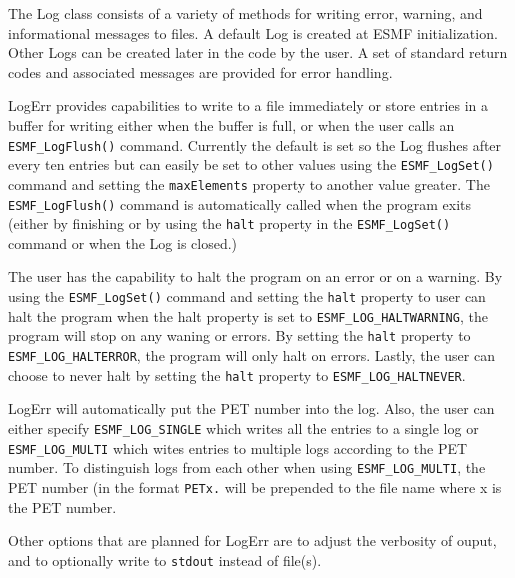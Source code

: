 



The Log class consists of a variety of methods for writing error, warning, and
informational messages to files.  A default Log is created at ESMF
initialization.  Other Logs can be created later in the code by the user.  A 
set of standard return codes and associated messages are provided for error 
handling.  

LogErr provides capabilities to write to a file immediately or store entries in
a buffer for writing either when the buffer is full, or when the user calls an 
{\tt ESMF\_LogFlush()} command.  Currently the default is set so the Log 
flushes after every ten entries but can easily be set to other values using the 
{\tt ESMF\_LogSet()} command and setting the {\tt maxElements} property to 
another value greater.  The {\tt ESMF\_LogFlush()} command is automatically 
called when the program exits (either by finishing or by using the {\tt halt} 
property in the {\tt ESMF\_LogSet()} command or when the Log is closed.)

The user has the capability to halt the program on an error or on a warning.
By using the {\tt ESMF\_LogSet()} command and setting the {\tt halt} property 
to user can halt the program when the halt property is set to 
{\tt ESMF\_LOG\_HALTWARNING}, the program will stop on any waning or errors.
By setting the {\tt halt} property to {\tt ESMF\_LOG\_HALTERROR}, the program 
will only halt on errors.  Lastly, the user can choose to never halt by setting
the {\tt halt} property to {\tt ESMF\_LOG\_HALTNEVER}.

LogErr will automatically put the PET number into the log.  Also, the user can 
either specify {\tt ESMF\_LOG\_SINGLE} which writes all the entries to a single 
log or {\tt ESMF\_LOG\_MULTI} which wites entries to multiple logs according to 
the PET number.  To distinguish logs from each other when using 
{\tt ESMF\_LOG\_MULTI}, the PET number (in the format {\tt PETx.} will be 
prepended to the file name where x is the PET number.
 
Other options that are planned for LogErr are to adjust the verbosity of ouput, 
and to optionally write to {\tt stdout} instead of file(s).




